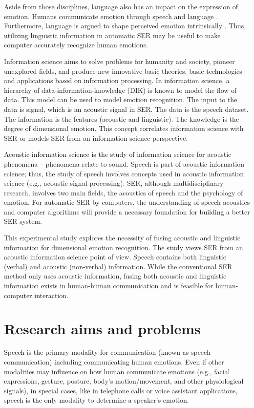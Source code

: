 Aside from those disciplines, language also has an impact on the expression of
emotion. Humans communicate emotion through speech and language
\cite{Kotz2011}. Furthermore,  language is argued to shape perceived emotion
intrinsically \cite{Lindquist2006}. Thus, utilizing linguistic information in
automatic SER may be useful to make computer accurately recognize human
emotions. 

Information science aims to solve problems for humanity and society, pioneer
unexplored fields, and produce new innovative basic theories, basic
technologies and applications based on information processing. In information
science, a hierarchy of data-information-knowledge (DIK) is known to model the
flow of data. This model can be used to model emotion recognition.  The input
to the data is signal, which is an acoustic signal in SER. The data is the
speech dataset. The information is the features (acoustic and linguistic). The
knowledge is the degree of dimensional emotion. This concept correlates
information science with SER or models SER from an information science
perspective. 

Acoustic information science is the study of information science for acoustic
phenomena -- phenomena relate to sound. Speech is part of acoustic information
science; thus, the study of speech involves concepts used in acoustic
information science (e.g., acoustic signal processing). SER, although
multidisciplinary research, involves two main fields, the acoustics of speech
and the psychology of emotion. For automatic SER by computers, the
understanding of speech acoustics and computer algorithms will provide a
necessary foundation for building a better SER system.

This experimental study explores the necessity of fusing acoustic and
linguistic information for dimensional emotion recognition. The study views SER
from an acoustic information science point of view. Speech contains both
linguistic (verbal) and acoustic (non-verbal) information. While the
conventional SER method only uses acoustic information, fusing both acoustic
and linguistic information exists in human-human communication and is feasible
for human-computer interaction.

\section{Research aims and problems}
Speech is the primary modality for communication (known as speech
communication) including communicating human emotions. Even if other modalities
may influence on how human communicate emotions (e.g., facial expressions,
gesture, posture, body's motion/movement, and other physiological signals), in
special cases, like in telephone calls or voice assistant applications, 
speech is the only modality to determine a speaker's emotion.

